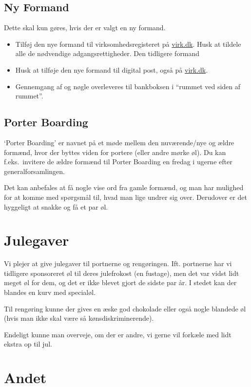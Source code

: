 \subsection{Ny Formand}
\label{sec:ny-formand}

Dette skal kun gøres, hvis der er valgt en ny formand.
\begin{itemize}
    \item Tilføj den nye formand til virksomhedsregisteret på \url{virk.dk}. Husk at tildele
    alle de nødvendige adgangsrettigheder. Den tidligere formand 
    \item Husk at tilføje den nye formand til digital post, også på \url{virk.dk}.
    \item Gennemgang af og nøgle overleveres til bankboksen i ``rummet ved siden af rummet''.
\end{itemize}

\subsection{Porter Boarding}
\label{sec:porter-boarding}

`Porter Boarding' er navnet på et møde mellem den nuværende/nye
og ældre formænd, hvor der byttes viden for portere (eller andre mørke
øl).
Du kan f.eks.~invitere de ældre formænd til Porter Boarding en fredag i ugerne efter
generalforsamlingen.

Det kan anbefales at få nogle vise ord fra gamle formænd, og man har
mulighed for at komme med spørgsmål til, hvad man lige undrer sig
over. Derudover er det hyggeligt at snakke og få et par øl.

\section{Julegaver}
\label{sec:julegaver}

Vi plejer at give julegaver til portnerne og
rengøringen. Ift. portnerne har vi tidligere sponsoreret øl til deres
julefrokost (en fustage), men det var vidst lidt meget øl for dem, og
det er ikke blevet gjort de sidste par år. I stedet kan der blandes en
kurv med specialøl.

Til rengøring kunne der gives en æske god chokolade eller også nogle
blandede øl (hvis man ikke skal være så kønsdiskriminerende).

Endeligt kunne man overveje, om der er andre, vi gerne vil forkæle med
lidt ekstra op til jul.

\section{Andet}
\label{sec:andet}

